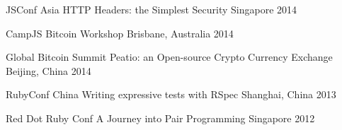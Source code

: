 \begin{cvhonors}

  \cvhonor
    {JSConf Asia} %
    {HTTP Headers: the Simplest Security} %
    {Singapore} %
    {2014} %

  \cvhonor
    {CampJS} %
    {Bitcoin Workshop} %
    {Brisbane, Australia} %
    {2014} %

  \cvhonor
    {Global Bitcoin Summit} %
    {Peatio: an Open-source Crypto Currency Exchange} %
    {Beijing, China} %
    {2014} %

  \cvhonor
    {RubyConf China} %
    {Writing expressive tests with RSpec} %
    {Shanghai, China} %
    {2013} %

  \cvhonor
    {Red Dot Ruby Conf} %
    {A Journey into Pair Programming} %
    {Singapore} %
    {2012} %

\end{cvhonors}

